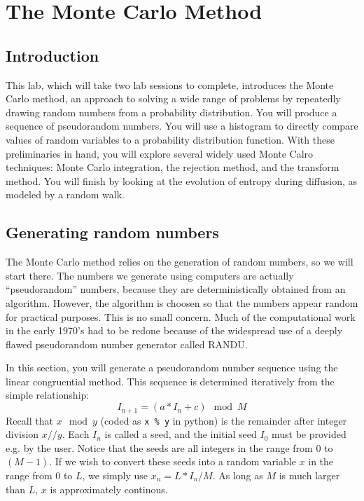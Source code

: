 \chapter{The Monte Carlo Method}

\section{Introduction}

This lab, which will take two lab sessions to complete, introduces the
Monte Carlo method, an approach to solving a wide range of problems by
repeatedly drawing random numbers from a probability distribution.
You will produce a sequence of pseudorandom numbers.  You will use a
histogram to directly compare values of random variables to a
probability distribution function.  With these preliminaries in hand,
you will explore several widely used Monte Calro techniques: Monte
Carlo integration, the rejection method, and the transform method.
You will finish by looking at the evolution of entropy during
diffusion, as modeled by a random walk.

\section{Generating random numbers}

The Monte Carlo method relies on the generation of random numbers, so
we will start there.  The numbers we generate using computers are
actually ``pseudorandom'' numbers, because they are deterministically
obtained from an algorithm.  However, the algorithm is choosen so that
the numbers appear random for practical purposes.  This is no small
concern.  Much of the computational work in the early 1970's had to be
redone because of the widespread use of a deeply flawed pseudorandom
number generator called RANDU.

In this section, you will generate a pseudorandom number sequence
using the linear congruential method.  This sequence is determined
iteratively from the simple relationship:
\begin{displaymath}
  I_{n+1} = (a*I_{n} + c) \mod M
\end{displaymath}
Recall that $x \mod y$ (coded as {\tt x \% y} in python) is the remainder
after integer division $x//y$.  Each $I_n$ is called a seed, and the
initial seed $I_0$ must be provided e.g. by the user.  Notice that the
seeds are all integers in the range from 0 to $(M-1)$.  If we wish to
convert these seeds into a random variable $x$ in the range from 0 to
$L$, we simply use $x_n = L * I_n / M$.  As long as $M$ is much larger
than $L$, $x$ is approximately continous.

